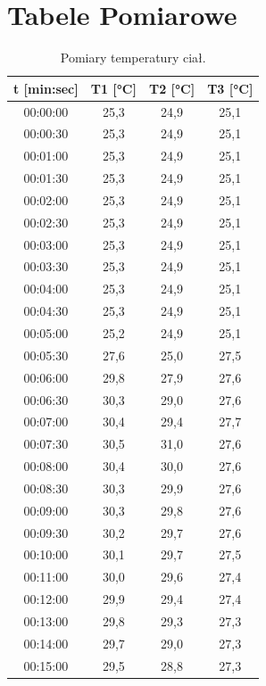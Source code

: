 \documentclass[a4paper,12pt]{article}
\begin{document}
\section{Tabele Pomiarowe}
\begin{table}[h]
    \centering
    \begin{tabular}{|c|c|c|c|}
        \hline
        \textbf{t [min:sec]} & \textbf{T1 [°C]} & \textbf{T2 [°C]} & \textbf{T3 [°C]} \\
        \hline
        00:00:00 & 25{,}3 & 24{,}9 & 25{,}1 \\
        \hline
        00:00:30 & 25{,}3 & 24{,}9 & 25{,}1 \\
        \hline
        00:01:00 & 25{,}3 & 24{,}9 & 25{,}1 \\
        \hline
        00:01:30 & 25{,}3 & 24{,}9 & 25{,}1 \\
        \hline
        00:02:00 & 25{,}3 & 24{,}9 & 25{,}1 \\
        \hline
        00:02:30 & 25{,}3 & 24{,}9 & 25{,}1 \\
        \hline
        00:03:00 & 25{,}3 & 24{,}9 & 25{,}1 \\
        \hline
        00:03:30 & 25{,}3 & 24{,}9 & 25{,}1 \\
        \hline
        00:04:00 & 25{,}3 & 24{,}9 & 25{,}1 \\
        \hline
        00:04:30 & 25{,}3 & 24{,}9 & 25{,}1 \\
        \hline
        00:05:00 & 25{,}2 & 24{,}9 & 25{,}1 \\
        \hline
        00:05:30 & 27{,}6 & 25{,}0 & 27{,}5 \\
        \hline
        00:06:00 & 29{,}8 & 27{,}9 & 27{,}6 \\
        \hline
        00:06:30 & 30{,}3 & 29{,}0 & 27{,}6 \\
        \hline
        00:07:00 & 30{,}4 & 29{,}4 & 27{,}7 \\
        \hline
        00:07:30 & 30{,}5 & 31{,}0 & 27{,}6 \\
        \hline
        00:08:00 & 30{,}4 & 30{,}0 & 27{,}6 \\
        \hline
        00:08:30 & 30{,}3 & 29{,}9 & 27{,}6 \\
        \hline
        00:09:00 & 30{,}3 & 29{,}8 & 27{,}6 \\
        \hline
        00:09:30 & 30{,}2 & 29{,}7 & 27{,}6 \\
        \hline
        00:10:00 & 30{,}1 & 29{,}7 & 27{,}5 \\
        \hline
        00:11:00 & 30{,}0 & 29{,}6 & 27{,}4 \\
        \hline
        00:12:00 & 29{,}9 & 29{,}4 & 27{,}4 \\
        \hline
        00:13:00 & 29{,}8 & 29{,}3 & 27{,}3 \\
        \hline
        00:14:00 & 29{,}7 & 29{,}0 & 27{,}3 \\
        \hline
        00:15:00 & 29{,}5 & 28{,}8 & 27{,}3 \\
        \hline
    \end{tabular}
    \caption{Pomiary temperatury ciał.}
\end{table}
\end{document}
